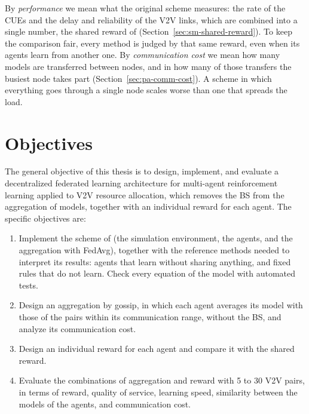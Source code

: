 By \emph{performance} we mean what the original scheme measures: the rate of the \acp{CUE} and the delay and
reliability of the \ac{V2V} links, which are combined into a single number, the shared reward of
\citet{li+22fedmarl} (Section~\ref{sec:sm-shared-reward}). To keep the comparison fair, every method is
judged by that same reward, even when its agents learn from another one. By \emph{communication cost} we
mean how many models are transferred between nodes, and in how many of those transfers the busiest node
takes part (Section~\ref{sec:pa-comm-cost}). A scheme in which everything goes through a single node scales
worse than one that spreads the load.

\section{Objectives}
\label{sec:intro-objectives}

The general objective of this thesis is to design, implement, and evaluate a decentralized federated
learning architecture for multi-agent reinforcement learning applied to \ac{V2V} resource allocation, which
removes the \ac{BS} from the aggregation of models, together with an individual reward for each agent. The
specific objectives are:

\begin{enumerate}
  \item Implement the scheme of \citet{li+22fedmarl} (the simulation environment, the agents, and the
    aggregation with \ac{FedAvg}), together with the reference methods needed to interpret its results:
    agents that learn without sharing anything, and fixed rules that do not learn. Check every equation of
    the model with automated tests.
  \item Design an aggregation by gossip, in which each agent averages its model with those of the pairs
    within its communication range, without the \ac{BS}, and analyze its communication cost.
  \item Design an individual reward for each agent and compare it with the shared reward.
  \item Evaluate the combinations of aggregation and reward with 5 to 30 \ac{V2V} pairs, in terms of reward,
    quality of service, learning speed, similarity between the models of the agents, and communication
    cost.
\end{enumerate}

